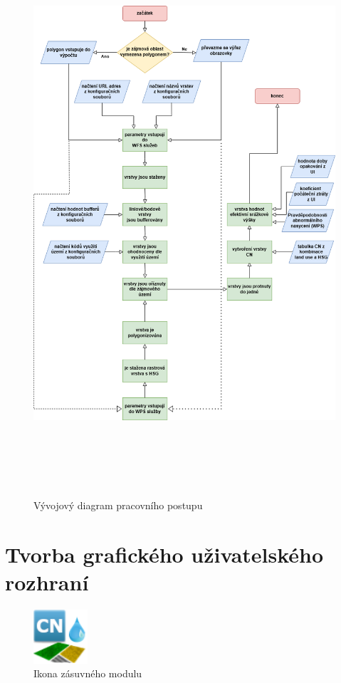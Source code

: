 \documentclass[a4paper,oneside,12pt]{book}
\begin{document}
\begin{figure}[H] \label{obr11}
\centering
\includegraphics[height=21cm]{pictures/diagram.png}
\caption{Vývojový diagram pracovního postupu}
\label{fig:diagram}
\end{figure}

\section{Tvorba grafického uživatelského rozhraní} \label{gui}

\hspace{10mm} 



\begin{figure}[H] \label{obr12}
\centering
\includegraphics[height=2cm]{pictures/icon.png}
\caption{Ikona zásuvného modulu}
\label{fig:icon}
\end{figure}
\end{document}
